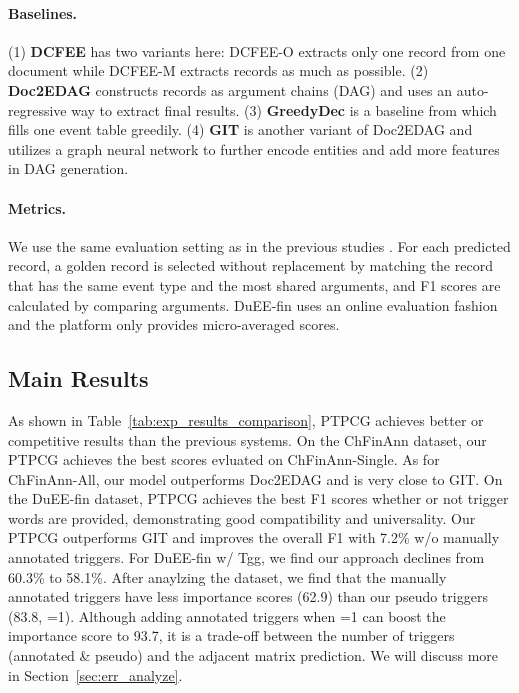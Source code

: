\paragraph{Baselines.}
(1) \textbf{DCFEE} \cite{yang-etal-2018-dcfee} has two variants here: DCFEE-O extracts only one record from one document while DCFEE-M extracts records as much as possible.
(2) \textbf{Doc2EDAG} \cite{zheng-etal-2019-doc2edag} constructs records as argument chains (DAG) and uses an auto-regressive way to extract final results.
(3) \textbf{GreedyDec} is a baseline from \citet{zheng-etal-2019-doc2edag} which fills one event table greedily.
(4) \textbf{GIT} \cite{xu-etal-2021-git} is another variant of Doc2EDAG and utilizes a graph neural network to further encode entities and add more features in DAG generation.

\paragraph{Metrics.}
We use the same evaluation setting as in the previous studies \cite{zheng-etal-2019-doc2edag,xu-etal-2021-git}.
For each predicted record, a golden record is selected without replacement by matching the record that has the same event type and the most shared arguments, and F1 scores are calculated by comparing arguments.
DuEE-fin uses an online evaluation fashion and the platform only provides micro-averaged scores.


\subsection{Main Results}

As shown in Table~\ref{tab:exp_results_comparison}, PTPCG achieves better or competitive results than the previous systems.
On the ChFinAnn dataset, our PTPCG achieves the best scores evluated on ChFinAnn-Single.
As for ChFinAnn-All, our model outperforms Doc2EDAG and is very close to GIT.
On the DuEE-fin dataset, PTPCG achieves the best F1 scores whether or not trigger words are provided, demonstrating good compatibility and universality.
Our PTPCG outperforms GIT and improves the overall F1 with 7.2\% w/o manually annotated triggers.
For DuEE-fin w/ Tgg, we find our approach declines from 60.3\% to 58.1\%.
After anaylzing the dataset, we find that the manually annotated triggers have less importance scores (62.9) than our pseudo triggers (83.8, =1).
Although adding annotated triggers when =1 can boost the importance score to 93.7, it is a trade-off between the number of triggers (annotated \& pseudo) and the adjacent matrix prediction.
We will discuss more in Section~\ref{sec:err_analyze}.

